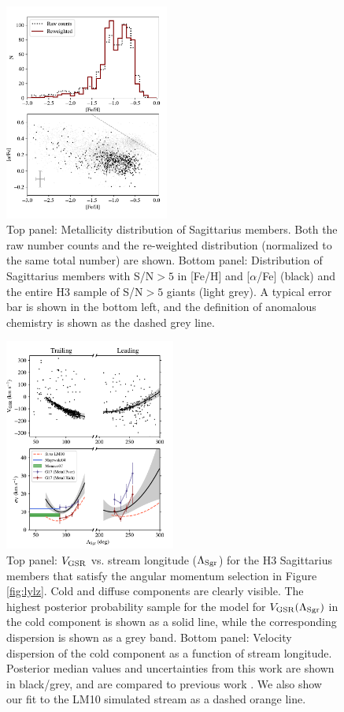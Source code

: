\documentclass[twocolumn,tighten,twocolappendix]{aastex63}
\newcommand{\sgr}{Sagittarius}
\newcommand{\Vgsr}{V_{\rm GSR}}
\begin{document}
\begin{CJK*}{UTF8}{gbsn}
\begin{figure}[!t]
\includegraphics[width=0.48\textwidth]{metallicities.pdf}
\caption{Top panel: Metallicity distribution of \sgr{} members. Both the raw number counts and the re-weighted distribution (normalized to the same total number) are shown. Bottom panel: Distribution of \sgr{} members with S/N$>5$ in [Fe/H] and [$\alpha$/Fe] (black) and the entire H3 sample of S/N$>5$ giants (light grey).  A typical error bar is shown in the bottom left, and the definition of anomalous chemistry is shown as the dashed grey line.
\label{fig:mdf}}
\end{figure}


\begin{figure}
    \includegraphics[width=0.5\textwidth]{vel_fit.pdf}
    \caption{Top panel: $\Vgsr$ vs. stream longitude ($\Lambda_{\rm Sgr}$) for the H3 \sgr{} members that satisfy the angular momentum selection in Figure \ref{fig:lylz}.  Cold and diffuse components are clearly visible.  The highest posterior probability sample for the model for $\Vgsr(\Lambda_{\rm Sgr})$ in the cold component is shown as a solid line, while the corresponding dispersion is shown as a grey band.  Bottom panel: Velocity dispersion of the cold component as a function of stream longitude. Posterior median values and uncertainties from this work are shown in black/grey, and are compared to previous work \citep{Majewski04, Monaco07, Gibbons17}.  We also show our fit to the LM10 simulated stream as a dashed orange line.
    \label{fig:vel_fit}}
\end{figure}



\end{CJK*}
\end{document}
